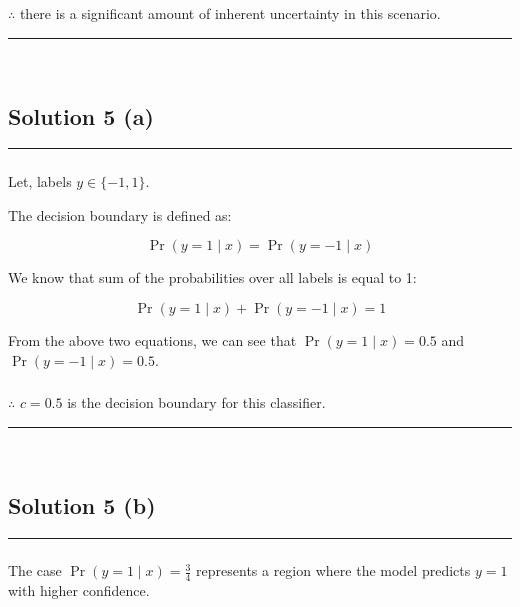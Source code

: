 \documentclass{article}
\begin{document}
\subsubsection*{\normalfont}{$\therefore$ there is a significant amount of inherent uncertainty in this scenario.}

\noindent\rule{\textwidth}{0.4pt}\\

\newpage

\subsection*{Solution 5 (a)}
\noindent\rule{\textwidth}{0.4pt}
\subsubsection*{}
\parbox{\textwidth}{
Let, labels $y \in \{-1,1\}$.
}
\parbox{\textwidth}{
The decision boundary is defined as:
}
$$\operatorname{Pr}(y=1 \mid x) = \operatorname{Pr}(y=-1 \mid x)$$

\parbox{\textwidth}{
We know that sum of the probabilities over all labels is equal to 1:
}
$$\operatorname{Pr}(y=1 \mid x) + \operatorname{Pr}(y=-1 \mid x) = 1$$

\parbox{\textwidth}{
From the above two equations, we can see that $\operatorname{Pr}(y=1 \mid x) = 0.5$ and $\operatorname{Pr}(y=-1 \mid x) = 0.5$.
}

\subsubsection*{\normalfont}{$\therefore$ $c =0.5$ is the decision boundary for this classifier.}

\noindent\rule{\textwidth}{0.4pt}\\

\newpage

\subsection*{Solution 5 (b)}
\noindent\rule{\textwidth}{0.4pt}

\subsubsection*{}
\parbox{\textwidth}{
The case $\operatorname{Pr}(y=1 \mid x) = \frac{3}{4}$ represents a region where the model predicts $y=1$ with higher confidence.
}
\end{document}
